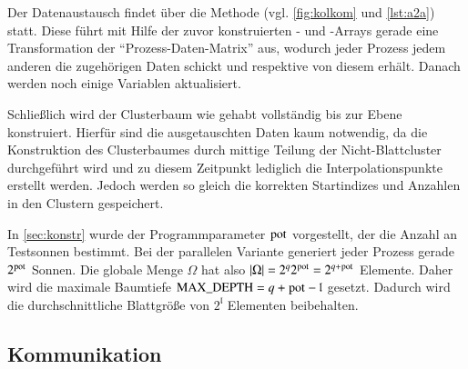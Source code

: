     Der Datenaustausch findet über die Methode  (vgl. \autoref{fig:kolkom} und \autoref{lst:a2a}) statt. Diese führt mit Hilfe der zuvor konstruierten - und 
    -Arrays gerade eine Transformation der ``Prozess-Daten-Matrix'' aus, wodurch jeder Prozess jedem anderen die zugehörigen Daten schickt und respektive von diesem erhält.
    Danach werden noch einige Variablen aktualisiert. 
    
    Schließlich wird der Clusterbaum wie gehabt vollständig bis zur Ebene  konstruiert. Hierfür sind die ausgetauschten Daten kaum notwendig, da die Konstruktion des Clusterbaumes
    durch mittige Teilung der Nicht-Blattcluster durchgeführt wird und zu diesem Zeitpunkt lediglich die Interpolationspunkte erstellt werden. Jedoch werden so gleich die korrekten Startindizes und
    Anzahlen in den Clustern gespeichert.
    
    In \autoref{sec:konstr} wurde der Programmparameter $\tcode{pot}$ vorgestellt, der die Anzahl an Testsonnen bestimmt. Bei der parallelen Variante generiert jeder Prozess gerade $2^{\tcode{pot}}$
    Sonnen. Die globale Menge $\Omega$ hat also $|\Omega| = 2^q 2^\tcode{pot} = 2^{q+\tcode{pot}}$ Elemente. Daher wird die maximale Baumtiefe $\tcode{MAX_DEPTH} = q + \tcode{pot} - \mathfrak{l}$ 
    gesetzt. Dadurch wird die durchschnittliche Blattgröße von $2^\mathfrak{l}$ Elementen beibehalten.
    
  \subsection{Kommunikation}
  \label{sec:komm}
    
    